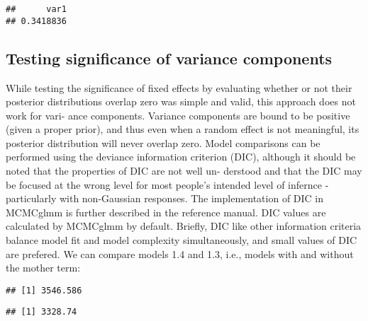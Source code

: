\documentclass[
  12pt,
]{book}
\newenvironment{Shaded}{\begin{snugshade}}{\end{snugshade}}
\newcommand{\FloatTok}[1]{\textcolor[rgb]{0.00,0.00,0.81}{#1}}
\newcommand{\NormalTok}[1]{#1}
\newcommand{\SpecialCharTok}[1]{\textcolor[rgb]{0.00,0.00,0.00}{#1}}
\begin{document}
\begin{verbatim}
##      var1 
## 0.3418836
\end{verbatim}

\hypertarget{testing-significance-of-variance-components}{%
\subsection{Testing significance of variance components}\label{testing-significance-of-variance-components}}

While testing the significance of fixed effects by evaluating whether or not their posterior distributions overlap zero was simple and valid, this approach does not work for vari- ance components. Variance components are bound to be positive (given a proper prior), and thus even when a random effect is not meaningful, its posterior distribution will never overlap zero. Model comparisons can be performed using the deviance information criterion (DIC), although it should be noted that the properties of DIC are not well un- derstood and that the DIC may be focused at the wrong level for most people's intended level of infernce - particularly with non-Gaussian responses. The implementation of DIC in MCMCglmm is further described in the reference manual. DIC values are calculated by MCMCglmm by default. Briefly, DIC like other information criteria balance model fit and model complexity simultaneously, and small values of DIC are prefered. We can compare models 1.4 and 1.3, i.e., models with and without the mother term:

\begin{Shaded}
\end{Shaded}

\begin{verbatim}
## [1] 3546.586
\end{verbatim}

\begin{Shaded}
\end{Shaded}

\begin{verbatim}
## [1] 3328.74
\end{verbatim}
\end{document}
